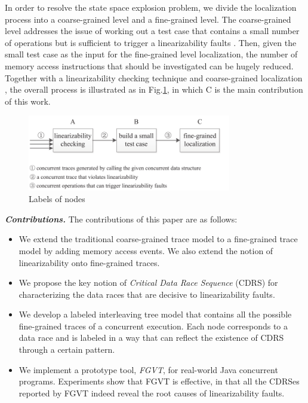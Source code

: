 \documentclass[runningheads]{llncs}
\begin{document}
In order to resolve the state space explosion problem, we divide the localization process into a coarse-grained level and a fine-grained level.
The coarse-grained level addresses the issue of working out a test case that contains a small number of operations but is sufficient to trigger a linearizability faults \cite{DBLP:conf/seke/ZhangWZ17}. 
Then, given the small test case as the input
for the fine-grained level localization, the number of memory access instructions that should be investigated 
can be hugely reduced.
Together with a linearizability checking technique \cite{DBLP:journals/concurrency/Lowe17} and coarse-grained localization \cite{DBLP:conf/seke/ZhangWZ17}, the overall process is illustrated as in Fig.\ref{fig:liucheng}, in which C is the main contribution of this work.

\vspace{-0.5cm}
\begin{figure}[!ht]
\centering
\includegraphics[width = 3.5in]{liucheng.pdf}
\caption{Labels of nodes}\label{fig:liucheng}
\end{figure}
\vspace{-0.5cm}

\noindent\textbf{\textit{Contributions.}}
The contributions of this paper are as follows:
\begin{itemize}
  \item We extend the traditional coarse-grained trace model to a fine-grained trace model by adding memory access events. We also extend the notion of linearizability onto fine-grained traces.
  \item We propose the key notion of \textit{Critical Data Race Sequence} (CDRS) for characterizing the data races that are decisive to linearizability faults.
  \item We develop a labeled interleaving tree model that contains all the possible fine-grained traces of a concurrent execution. Each node corresponds to a data race and is labeled in a way that can reflect the existence of CDRS through a certain pattern.
  \item We implement a prototype tool, \textit{FGVT}, for real-world Java concurrent programs. Experiments show that FGVT is effective, in that all the CDRSes reported by FGVT indeed reveal the root causes of linearizability faults.
\end{itemize}
\end{document}
